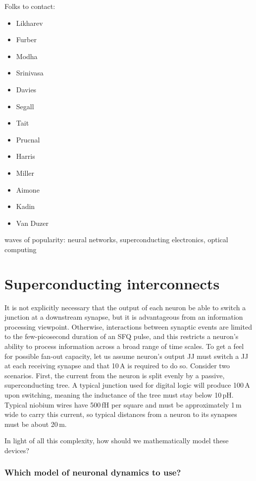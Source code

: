 \documentclass[twocolumn]{article}
\begin{document}
\vspace{3em}
Folks to contact:
\begin{itemize} 
\item Likharev
\item Furber
\item Modha
\item Srinivasa
\item Davies
\item Segall
\item Tait
\item Prucnal
\item Harris
\item Miller
\item Aimone
\item Kadin
\item Van Duzer
\end{itemize}
	
\vspace{3em}
waves of popularity: neural networks, superconducting electronics, optical computing	
	
\newpage
\appendix

\section{\label{sec:superconducting_interconnects}Superconducting interconnects}
It is not explicitly necessary that the output of each neuron be able to switch a junction at a downstream synapse, but it is advantageous from an information processing viewpoint. Otherwise, interactions between synaptic events are limited to the few-picosecond duration of an SFQ pulse, and this restricts a neuron's ability to process information across a broad range of time scales. To get a feel for possible fan-out capacity, let us assume neuron's output JJ must switch a JJ at each receiving synapse and that 10\,\textmu A is required to do so. Consider two scenarios. First, the current from the neuron is split evenly by a passive, superconducting tree. A typical junction used for digital logic will produce 100\,\textmu A upon switching, meaning the inductance of the tree must stay below 10\,pH. Typical niobium wires have 500\,fH per square and must be approximately 1\,\textmu m wide to carry this current, so typical distances from a neuron to its synapses must be about 20\,\textmu m.

In light of all this complexity, how should we mathematically model these devices?

\subsubsection{Which model of neuronal dynamics to use?}





\end{document}

